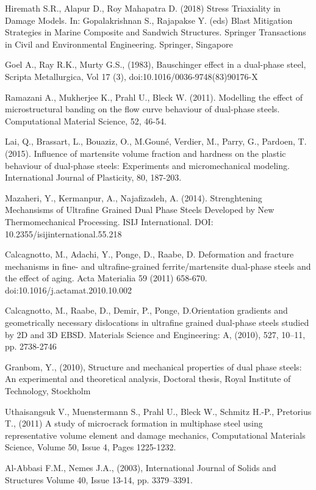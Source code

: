 \documentclass{article}
\begin{document}
\begin{thebibliography}{22}
Hiremath S.R., Alapur D., Roy Mahapatra D. (2018) Stress Triaxiality in Damage Models. In: Gopalakrishnan S., Rajapakse Y. (eds) Blast Mitigation Strategies in Marine Composite and Sandwich Structures. Springer Transactions in Civil and Environmental Engineering. Springer, Singapore

Goel A., Ray  R.K., Murty G.S., (1983), Bauschinger effect in a dual-phase steel, Scripta Metallurgica, Vol 17 (3), doi:10.1016/0036-9748(83)90176-X

Ramazani A., Mukherjee K., Prahl U., Bleck W. (2011). Modelling the effect of microstructural banding on the flow curve behaviour of dual-phase steels. Computational Material Science, 52, 46-54.

Lai, Q., Brassart, L., Bouaziz, O., M.Gouné, Verdier, M., Parry, G., Pardoen, T. (2015). Influence of martensite volume fraction and hardness on the plastic behaviour of dual-phase steels: Experiments and micromechanical modeling. International Journal of Plasticity, 80, 187-203.

Mazaheri, Y., Kermanpur, A., Najafizadeh, A. (2014). Strenghtening Mechansisms of Ultrafine Grained Dual Phase Steels Developed by New Thermomechanical Processing. ISIJ International. DOI: 10.2355/isijinternational.55.218

Calcagnotto, M., Adachi, Y., Ponge, D., Raabe, D. Deformation and fracture mechanisms in fine- and ultrafine-grained ferrite/martensite dual-phase steels and the effect of aging. Acta Materialia 59 (2011) 658-670. doi:10.1016/j.actamat.2010.10.002

Calcagnotto, M., Raabe, D., Demir, P., Ponge, D.Orientation gradients and geometrically necessary dislocations in ultrafine grained dual-phase steels studied by 2D and 3D EBSD. Materials Science and Engineering: A, (2010), 527, 10–11, pp. 2738-2746

Granbom, Y., (2010), Structure and mechanical properties of dual phase steels: An experimental and theoretical analysis, Doctoral thesis, Royal Institute of Technology, Stockholm

Uthaisangsuk V., Muenstermann S.,  Prahl U., Bleck  W., Schmitz H.-P.,  Pretorius T., (2011) A study of microcrack formation in multiphase steel using representative volume
element and damage mechanics, Computational Materials Science, Volume 50, Issue
4, Pages 1225-1232.

Al-Abbasi F.M., Nemes  J.A.,  (2003), International Journal of Solids and Structures Volume 40, Issue 13-14, pp. 3379–3391.
\end{thebibliography}
\end{document}
